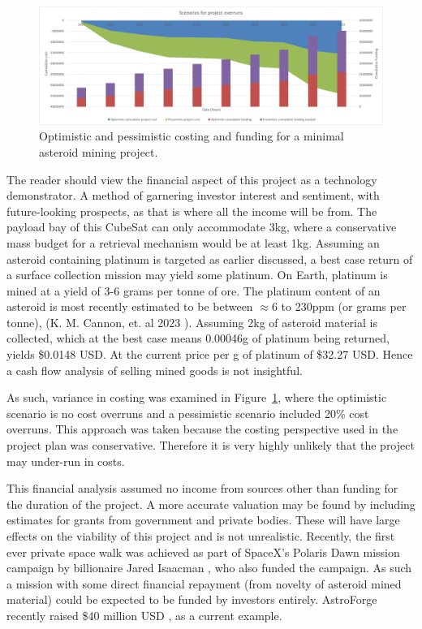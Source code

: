 \documentclass[conference]{IEEEtran}
\begin{document}
\begin{figure}[H]
\centering
\includegraphics[width=\linewidth]{cash_flow_projection.png}
\caption{\label{fig:cashflow}Optimistic and pessimistic costing and funding for a minimal asteroid mining project.}
\end{figure}

The reader should view the financial aspect of this project as a technology demonstrator. A method of garnering investor interest and sentiment, with future-looking prospects, as that is where all the income will be from. The payload bay of this CubeSat can only accommodate 3kg, where a conservative mass budget for a retrieval mechanism would be at least 1kg. Assuming an asteroid containing platinum is targeted as earlier discussed, a best case return of a surface collection mission may yield some platinum. On Earth, platinum is mined at a yield of 3-6 grams per tonne of ore. The platinum content of an asteroid is most recently estimated to be between $\approx 6$ to 230ppm (or grams per tonne), (K. M. Cannon, et. al 2023 \cite{CANNON2023105608}).  Assuming 2kg of asteroid material is collected,  which at the best case means 0.00046g of platinum being returned, yields \$0.0148 USD. At the current price per g of platinum of \$32.27 USD. Hence a cash flow analysis of selling mined goods is not insightful.

As such, variance in costing was examined in Figure~\ref{fig:cashflow}, where the optimistic scenario is no cost overruns and a pessimistic scenario included 20\% cost overruns. This approach was taken because the costing perspective used in the project plan was conservative. Therefore it is very highly unlikely that the project may under-run in costs.

This financial analysis assumed no income from sources other than funding for the duration of the project. A more accurate valuation may be found by including estimates for grants from government and private bodies. These will have large effects on the viability of this project and is not unrealistic. Recently, the first ever private space walk was achieved as part of SpaceX's Polaris Dawn mission campaign by billionaire Jared Isaacman \cite{comerford-2024}, who also funded the campaign. As such a mission with some direct financial repayment (from novelty of asteroid mined material) could be expected to be funded by investors entirely. AstroForge recently raised \$40 million USD \cite{foust-2024}, as a current example.
\end{document}
